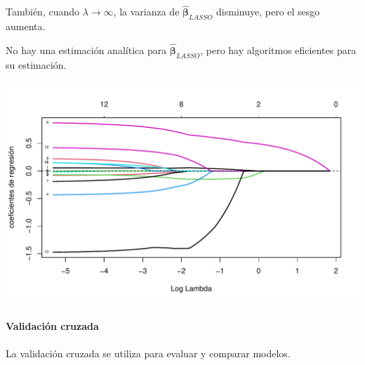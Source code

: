 \documentclass[
]{article}
\newenvironment{Shaded}{\begin{snugshade}}{\end{snugshade}}
\newcommand{\AttributeTok}[1]{\textcolor[rgb]{0.77,0.63,0.00}{#1}}
\newcommand{\DecValTok}[1]{\textcolor[rgb]{0.00,0.00,0.81}{#1}}
\newcommand{\FunctionTok}[1]{\textcolor[rgb]{0.00,0.00,0.00}{#1}}
\newcommand{\NormalTok}[1]{#1}
\newcommand{\OtherTok}[1]{\textcolor[rgb]{0.56,0.35,0.01}{#1}}
\newcommand{\SpecialCharTok}[1]{\textcolor[rgb]{0.00,0.00,0.00}{#1}}
\newcommand{\StringTok}[1]{\textcolor[rgb]{0.31,0.60,0.02}{#1}}
\begin{document}
También, cuando \(\lambda \rightarrow \infty\), la varianza de \(\widehat{\boldsymbol \beta}_{LASSO}\) disminuye, pero el sesgo aumenta.

No hay una estimación analítica para \(\widehat{\boldsymbol \beta}_{LASSO}\), pero hay algoritmos
eficientes para su estimación.

\begin{Shaded}
\end{Shaded}

\includegraphics{MLG2_files/figure-latex/Vgrasalasso-1.pdf}

\hypertarget{validaciuxf3n-cruzada}{%
\paragraph{Validación cruzada}\label{validaciuxf3n-cruzada}}

La validación cruzada se utiliza para evaluar y comparar modelos.
\end{document}
